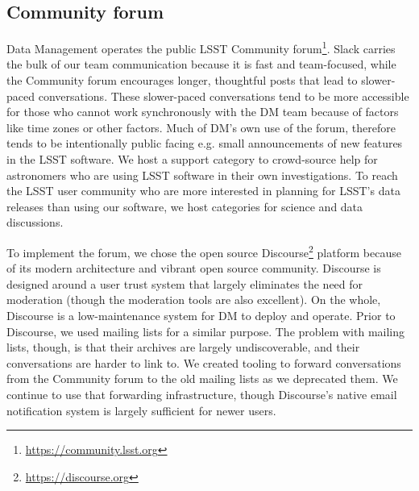 \subsection{Community forum}
\label{sec:forum}

Data Management operates the public LSST Community forum\footnote{\url{https://community.lsst.org}}.
Slack carries the bulk of our team communication because it is fast and team-focused, while
the Community forum  encourages longer, thoughtful posts that lead to slower-paced conversations.
These slower-paced conversations tend to be more accessible for those who cannot work synchronously with the DM team because of factors like time zones or other factors.
Much of DM's own use of the forum, therefore tends to be intentionally public facing e.g.
small announcements of new features in the LSST software.
We host a support category to crowd-source help for astronomers who are using LSST software in their own investigations.
To reach the LSST user community who are more interested in planning for LSST's data releases than using our software, we host categories for science and data discussions.

\noindent To implement the forum, we chose the open source Discourse\footnote{\url{https://discourse.org}} platform because of its modern architecture and vibrant open source community.
Discourse is designed around a user trust system that largely eliminates the need for moderation (though the moderation tools are also excellent).
On the whole, Discourse is a low-maintenance system for DM to deploy and operate.
Prior to Discourse, we used mailing lists for a similar purpose.
The problem with mailing lists, though, is that their archives are largely undiscoverable, and their conversations are harder to link to.
We created tooling to forward conversations from the Community forum to the old mailing lists as we deprecated them.
We continue to use that forwarding infrastructure, though Discourse's native email notification system is largely sufficient for newer users.
